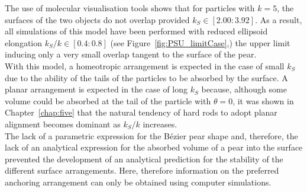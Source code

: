 The use of molecular visualisation tools shows that for particles with $k=5$, the surfaces of 
the two objects do not overlap provided $k_S \in [2.00:3.92]$. As a result, all simulations of this 
model have been performed with reduced ellipsoid elongation $k_S/k \in [0.4:0.8]$ (see
Figure~\ref{fig:PSU_limitCase},) the upper limit inducing only a very small overlap 
tangent to the surface of the pear.\\
%
With this model, a homeotropic arrangement is expected in the case of small $k_S$ due to the
ability of the tails of the particles to be absorbed by the surface. A planar arrangement is 
expected in the case of
long $k_S$ because, although some volume could be absorbed at the tail of the particle with
$\theta=0$, it was shown in Chapter~\ref{chap:five}  that the natural tendency of hard rods to adopt
planar alignment becomes dominant as $k_S/k$ increases.\\
%
The lack of a parametric expression for the B\'ezier pear shape and, therefore, the lack of an
analytical expression for the absorbed volume of a pear into the surface prevented the
development of an analytical
prediction for the stability of the different surface arrangements. Here, therefore information
on the preferred anchoring arrangement can only be obtained using computer simulations.




